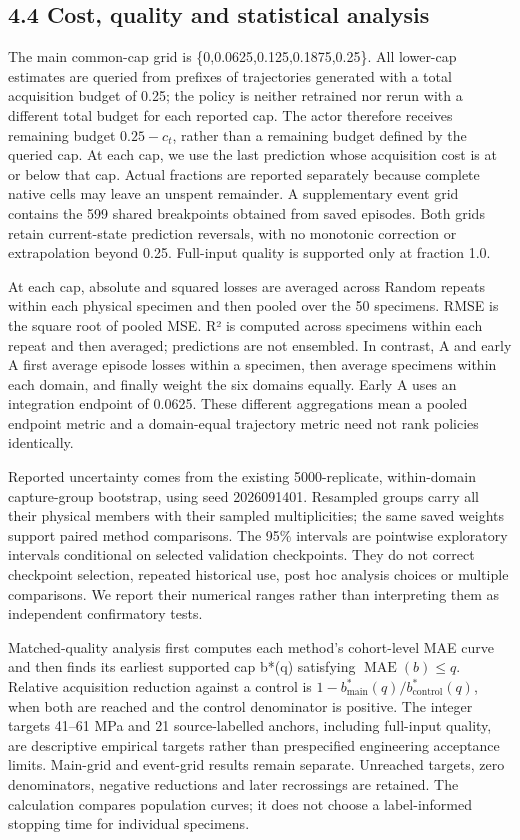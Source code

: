 \subsection{4.4 Cost, quality and statistical analysis}\label{cost-quality-and-statistical-analysis}

The main common-cap grid is \{0,0.0625,0.125,0.1875,0.25\}. All lower-cap estimates are queried from prefixes of trajectories generated with a total acquisition budget of 0.25; the policy is neither retrained nor rerun with a different total budget for each reported cap. The actor therefore receives remaining budget \(0.25-c_t\), rather than a remaining budget defined by the queried cap. At each cap, we use the last prediction whose acquisition cost is at or below that cap. Actual fractions are reported separately because complete native cells may leave an unspent remainder. A supplementary event grid contains the 599 shared breakpoints obtained from saved episodes. Both grids retain current-state prediction reversals, with no monotonic correction or extrapolation beyond 0.25. Full-input quality is supported only at fraction 1.0.

At each cap, absolute and squared losses are averaged across Random repeats within each physical specimen and then pooled over the 50 specimens. RMSE is the square root of pooled MSE. R² is computed across specimens within each repeat and then averaged; predictions are not ensembled. In contrast, A and early A first average episode losses within a specimen, then average specimens within each domain, and finally weight the six domains equally. Early A uses an integration endpoint of 0.0625. These different aggregations mean a pooled endpoint metric and a domain-equal trajectory metric need not rank policies identically.

Reported uncertainty comes from the existing 5000-replicate, within-domain capture-group bootstrap, using seed 2026091401. Resampled groups carry all their physical members with their sampled multiplicities; the same saved weights support paired method comparisons. The 95\% intervals are pointwise exploratory intervals conditional on selected validation checkpoints. They do not correct checkpoint selection, repeated historical use, post hoc analysis choices or multiple comparisons. We report their numerical ranges rather than interpreting them as independent confirmatory tests.

Matched-quality analysis first computes each method's cohort-level MAE curve and then finds its earliest supported cap b*(q) satisfying \(\operatorname{MAE}(b)\le q\). Relative acquisition reduction against a control is \(1-b^*_{\mathrm{main}}(q)/b^*_{\mathrm{control}}(q)\), when both are reached and the control denominator is positive. The integer targets 41--61 MPa and 21 source-labelled anchors, including full-input quality, are descriptive empirical targets rather than prespecified engineering acceptance limits. Main-grid and event-grid results remain separate. Unreached targets, zero denominators, negative reductions and later recrossings are retained. The calculation compares population curves; it does not choose a label-informed stopping time for individual specimens.
